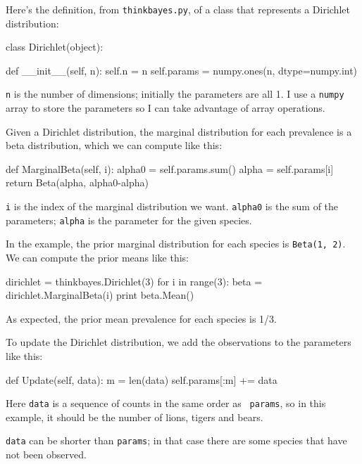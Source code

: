 \documentclass[12pt]{book}
\theoremstyle{exercise}
\begin{document}
Here's the definition, from {\tt thinkbayes.py}, of a class that
represents a Dirichlet distribution:

\begin{code}
class Dirichlet(object):

    def __init__(self, n):
        self.n = n
        self.params = numpy.ones(n, dtype=numpy.int)
\end{code}

{\tt n} is the number of dimensions; initially the parameters
are all 1.  I use a {\tt numpy} array to store the parameters
so I can take advantage of array operations.

Given a Dirichlet distribution, the marginal distribution
for each prevalence is a beta distribution, which we can
compute like this:

\begin{code}
    def MarginalBeta(self, i):
        alpha0 = self.params.sum()
        alpha = self.params[i]
        return Beta(alpha, alpha0-alpha)
\end{code}

{\tt i} is the index of the marginal distribution we want.
{\tt alpha0} is the sum of the parameters; {\tt alpha} is the
parameter for the given species.

In the example, the prior marginal distribution for each species
is {\tt Beta(1, 2)}.  We can compute the prior means like
this:

\begin{code}
    dirichlet = thinkbayes.Dirichlet(3)
    for i in range(3):
        beta = dirichlet.MarginalBeta(i)
        print beta.Mean()
\end{code}

As expected, the prior mean prevalence for each species is 1/3.

To update the Dirichlet distribution, we add the
observations to the parameters like this:

\begin{code}
    def Update(self, data):
        m = len(data)
        self.params[:m] += data
\end{code}

Here {\tt data} is a sequence of counts in the same order as {\tt
  params}, so in this example, it should be the number of lions,
tigers and bears.

{\tt data} can be shorter than {\tt params}; in that
case there are some species that have not been
observed.
\end{document}
